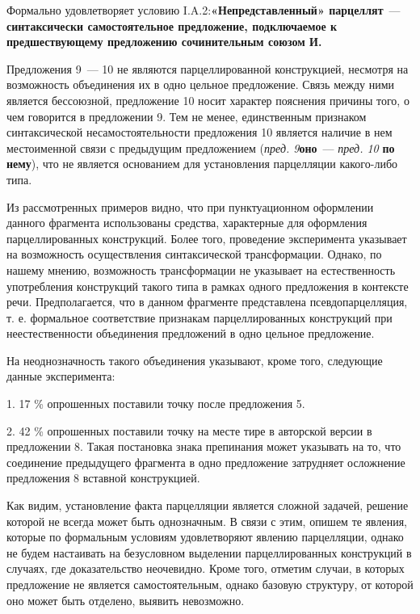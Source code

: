 \documentclass{kursa4}
\begin{document}
      Формально удовлетворяет условию I.A.2:\textbf{«Непредставленный» парцеллят}~--- \textbf{синтаксически самостоятельное предложение, подключаемое к предшествующему предложению сочинительным союзом И.}

      Предложения 9~--- 10 не являются парцеллированной конструкцией, несмотря на возможность объединения их в одно цельное предложение. Связь между ними является бессоюзной, предложение 10 носит характер пояснения причины того, о чем говорится в предложении 9. Тем не менее, единственным признаком синтаксической несамостоятельности предложения 10 является наличие в нем местоименной связи с предыдущим предложением (\textit{пред. 9}\textbf{оно}~--- \textit{пред. 10}{
      }\textbf{{по нему}}{), что не является основанием для установления парцелляции какого-либо типа.}

      {}{Из рассмотренных примеров видно, что при пунктуационном оформлении данного фрагмента использованы средства, характерные для оформления парцеллированных конструкций. Более того, проведение эксперимента указывает на возможность осуществления синтаксической трансформации. Однако, по нашему мнению, возможность трансформации не указывает на естественность употребления конструкций такого типа в рамках одного предложения в контексте речи.
      }{Предполагается, что в данном фрагменте представлена псевдопарцелляция, т. е. формальное соответствие признакам парцеллированных конструкций при неестественности объединения предложений в одно цельное предложение. }

      {}{На неоднозначность такого объединения указывают, кроме того, следующие данные эксперимента:}

      {1. 17 \% опрошенных поставили точку после предложения 5.}

      {2. }{42 \%
      опрошенных поставили точку на месте тире в авторской версии в предложении 8. Такая постановка знака препинания может указывать на то, что соединение предыдущего фрагмента в одно предложение затрудняет осложнение предложения 8 вставной конструкцией. }

      {Как видим, установление факта парцелляции является сложной задачей, решение которой не всегда может быть однозначным. В связи с этим, опишем те явления, которые по формальным условиям удовлетворяют явлению парцелляции, однако не будем настаивать на безусловном выделении парцеллированных конструкций в случаях, где доказательство неочевидно. Кроме того, отметим случаи, в которых предложение не
      }{является}{
      самостоятельным, однако базовую структуру, от которой оно может быть отделено, выявить невозможно. }
\end{document}
